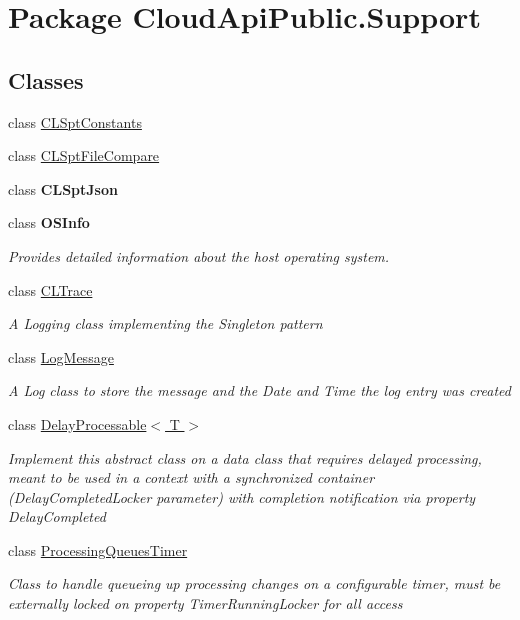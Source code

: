 \hypertarget{namespace_cloud_api_public_1_1_support}{\section{Package Cloud\-Api\-Public.\-Support}
\label{namespace_cloud_api_public_1_1_support}
}
\subsection*{Classes}
\begin{DoxyCompactItemize}
\item 
class \hyperlink{class_cloud_api_public_1_1_support_1_1_c_l_spt_constants}{C\-L\-Spt\-Constants}
\item 
class \hyperlink{class_cloud_api_public_1_1_support_1_1_c_l_spt_file_compare}{C\-L\-Spt\-File\-Compare}
\item 
class {\bfseries C\-L\-Spt\-Json}
\item 
class {\bfseries O\-S\-Info}
\begin{DoxyCompactList}\small\item\em Provides detailed information about the host operating system. \end{DoxyCompactList}\item 
class \hyperlink{class_cloud_api_public_1_1_support_1_1_c_l_trace}{C\-L\-Trace}
\begin{DoxyCompactList}\small\item\em A Logging class implementing the Singleton pattern \end{DoxyCompactList}\item 
class \hyperlink{class_cloud_api_public_1_1_support_1_1_log_message}{Log\-Message}
\begin{DoxyCompactList}\small\item\em A Log class to store the message and the Date and Time the log entry was created \end{DoxyCompactList}\item 
class \hyperlink{class_cloud_api_public_1_1_support_1_1_delay_processable_3_01_t_01_4}{Delay\-Processable$<$ T $>$}
\begin{DoxyCompactList}\small\item\em Implement this abstract class on a data class that requires delayed processing, meant to be used in a context with a synchronized container (Delay\-Completed\-Locker parameter) with completion notification via property Delay\-Completed \end{DoxyCompactList}\item 
class \hyperlink{class_cloud_api_public_1_1_support_1_1_processing_queues_timer}{Processing\-Queues\-Timer}
\begin{DoxyCompactList}\small\item\em Class to handle queueing up processing changes on a configurable timer, must be externally locked on property Timer\-Running\-Locker for all access \end{DoxyCompactList}\end{DoxyCompactItemize}
